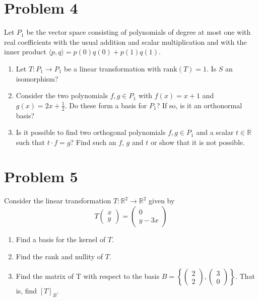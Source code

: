 \documentclass[a4paper,12pt,fleqn]{article}
\def\R{\mathbb R}
\begin{document}
\section*{Problem 4}
Let $P_1$ be the vector space consisting of polynomials of degree at most one with real coefficients with
the usual addition and scalar multiplication and with the inner product $\langle p,q\rangle=p(0)q(0)+p(1)q(1)$.
\begin{enumerate}
\item Let $T: P_1 \to P_1$ be a linear transformation with $\text{rank}(T)=1$.
Is $S$ an isomorphism?
\item Consider the two polynomials $f,g \in P_1$ with $f(x)=x+1$ and $g(x)=2x+\frac12$.
Do these form a basis for $P_1$? If so, is it an orthonormal basis?
\item Is it possible to find two orthogonal polynomials $f,g\in P_1$ and a scalar $t\in \R$ such that 
$t \cdot f=g$? Find such an $f$, $g$ and $t$ or show that it is not possible.
\end{enumerate}

\newpage

\section*{Problem 5}
Consider the linear transformation $T: \R^2 \rightarrow \R^2$ given by
$$
	T\left( \begin{array}{c} x \\ y \end{array} \right) = \left( \begin{array}{c} 0 \\ y-3x \end{array} \right)
$$
\begin{enumerate}
\item Find a basis for the kernel of $T$.
\item Find the rank and nullity of $T$.
\item Find the matrix of T with respect to the basis $B=\left\{ \left( \begin{array}{c} 2 \\ 2 \end{array} \right), \left( \begin{array}{c} 3 \\ 0 \end{array} \right)  \right\}$.
That is, find $[T]_{B}$.
\end{enumerate}
\end{document}
